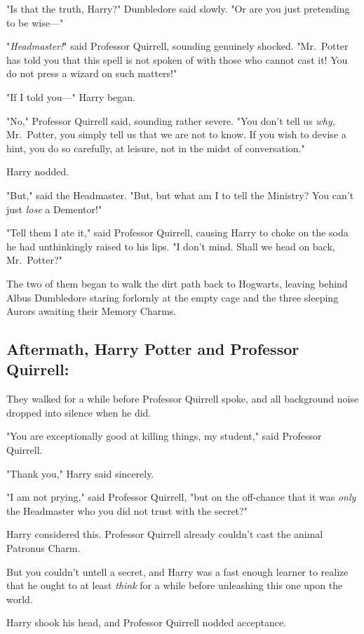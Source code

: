 "Is that the truth, Harry?" Dumbledore said slowly. "Or are you just pretending
to be wise\mbox{---}"

"\emph{Headmaster!}" said Professor Quirrell, sounding genuinely shocked.
"Mr.~Potter has told you that this spell is not spoken of with those who cannot
cast it! You do not press a wizard on such matters!"

"If I told you\mbox{---}" Harry began.

"No," Professor Quirrell said, sounding rather severe. "You don't tell us
\emph{why,} Mr.~Potter, you simply tell us that we are not to know. If you wish
to devise a hint, you do so carefully, at leisure, not in the midst of
conversation."

Harry nodded.

"But," said the Headmaster. "But, but what am I to tell the Ministry? You can't
just \emph{lose} a Dementor!"

"Tell them I ate it," said Professor Quirrell, causing Harry to choke on the
soda he had unthinkingly raised to his lips. "I don't mind. Shall we head on
back, Mr.~Potter?"

The two of them began to walk the dirt path back to Hogwarts, leaving behind
Albus Dumbledore staring forlornly at the empty cage and the three sleeping
Aurors awaiting their Memory Charms.
\sbreak
\subsection{Aftermath, Harry Potter and Professor Quirrell:}

They walked for a while before Professor Quirrell spoke, and all background
noise dropped into silence when he did.

"You are exceptionally good at killing things, my student," said Professor
Quirrell.

"Thank you," Harry said sincerely.

"I am not prying," said Professor Quirrell, "but on the off-chance that it was
\emph{only} the Headmaster who you did not trust with the secret\el?"

Harry considered this. Professor Quirrell already couldn't cast the animal
Patronus Charm.

But you couldn't untell a secret, and Harry was a fast enough learner to
realize that he ought to at least \emph{think} for a while before unleashing
this one upon the world.

Harry shook his head, and Professor Quirrell nodded acceptance.


